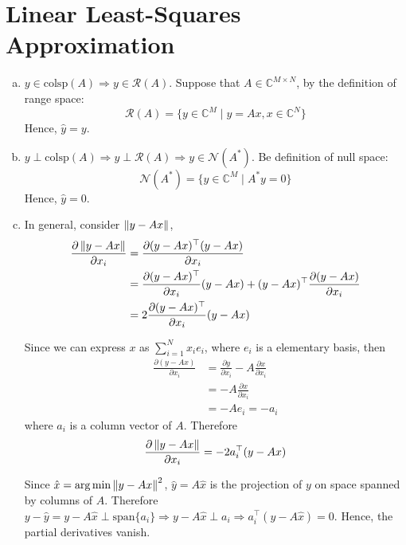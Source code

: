 \section{Linear Least-Squares Approximation}\label{sec:part2}

\begin{enumerate}[(a)]
\item $y \in \text{colsp}(A) \Rightarrow y \in \mathcal{R}(A)$. Suppose that $A \in \mathbb{C}^{M \times N}$, by the definition of range space:
\[\mathcal{R}(A) = \{y \in \mathbb{C}^M \mid y = Ax, x \in \mathbb{C}^N\}\]
Hence, $\hat{y} = y$.

\item $y \perp \text{colsp}(A) \Rightarrow y \perp \mathcal{R}(A) \Rightarrow y \in \mathcal{N}(A^*)$. Be definition of null space:
\[\mathcal{N}(A^*) = \{y \in \mathbb{C}^M \mid A^*y=0\}\]
Hence, $\hat{y}=0$.

\item In general, consider $\left\lVert y - Ax \right\rVert$,
\begin{align*}
	\frac{\partial \left\lVert y-Ax \right\rVert}{\partial x_i}
	&= \frac{\partial (y-Ax)^\top(y-Ax)}{\partial x_i} \\
	&= \frac{\partial (y-Ax)^\top}{\partial x_i} (y-Ax) + (y-Ax)^\top \frac{\partial (y-Ax)}{\partial x_i} \\
	&= 2\frac{\partial (y-Ax)^\top}{\partial x_i}(y-Ax)
\end{align*}

Since we can express $x$ as $\sum_{i=1}^{N} x_i e_i$, where $e_i$ is a elementary basis, then
\begin{align*}
	\frac{\partial (y-Ax)}{\partial x_i} 
	&= \frac{\partial y}{\partial x_i} - A\frac{\partial x}{\partial x_i} \\
	&= -A\frac{\partial x}{\partial x_i} \\
	&= -Ae_i = -a_i
\end{align*}
where $a_i$ is a column vector of $A$. Therefore
\begin{align*}
	\frac{\partial \left\lVert y-Ax \right\rVert}{\partial x_i} = -2a_i^\top(y-Ax)
\end{align*}

Since $\hat{x} = \arg \min \left\lVert y-Ax \right\rVert^2$, $\hat{y} = A\hat{x}$ is the projection of $y$ on space spanned by columns of $A$. Therefore $y - \hat{y} = y - A\hat{x} \perp \text{span}\{a_i\} \Rightarrow y - A\hat{x} \perp a_i \Rightarrow a_i^\top (y-A\hat{x}) = 0$. Hence, the partial derivatives vanish.
\end{enumerate}